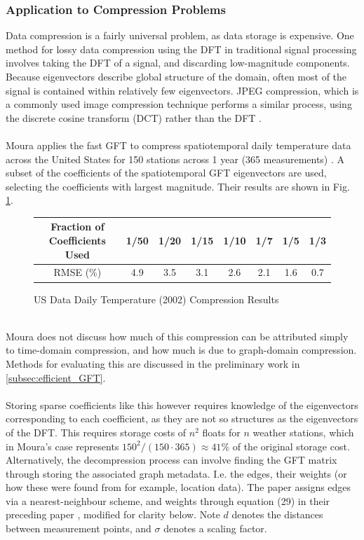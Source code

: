 \documentclass[12pt,a4paper]{article} %
\begin{document}
\subsubsection{Application to Compression Problems}
\label{subsec:compression}
Data compression is a fairly universal problem, as data storage is expensive. One method for lossy data compression using the DFT in traditional signal processing involves taking the DFT of a signal, and discarding low-magnitude components. Because eigenvectors describe global structure of the domain, often most of the signal is contained within relatively few eigenvectors. JPEG compression, which is a commonly used image compression technique performs a similar process, using the discrete cosine transform (DCT) rather than the DFT \cite{JPEG}.\\\\
Moura applies the fast GFT to compress spatiotemporal daily temperature data across the United States for 150 stations across 1 year (365 measurements) \cite{moura}. A subset of the coefficients of the spatiotemporal GFT eigenvectors are used, selecting the coefficients with largest magnitude. Their results are shown in Fig. \ref{fig:moura-results}.
\begin{figure}[!ht]
    \centering
        \begin{tabular}{|c|c|c|c|c|c|c|c|}
         \hline
         Fraction of Coefficients Used & 1/50 & 1/20 & 1/15 & 1/10 & 1/7 & 1/5 & 1/3 \\
         \hline
         RMSE (\%) & 4.9 & 3.5 & 3.1 & 2.6 & 2.1 & 1.6 & 0.7 \\
         \hline
    \end{tabular}
    \caption{US Data Daily Temperature (2002) Compression Results}
    \label{fig:moura-results}
\end{figure}\\
Moura does not discuss how much of this compression can be attributed simply to time-domain compression, and how much is due to graph-domain compression. Methods for evaluating this are discussed in the preliminary work in \ref{subsec:efficient_GFT}.\\\\
Storing sparse coefficients like this however requires knowledge of the eigenvectors corresponding to each coefficient, as they are not so structures as the eigenvectors of the DFT. This requires storage costs of $n^2$ floats for $n$ weather stations, which in Moura's case represents $150^2/(150\cdot365)\approx41\%$ of the original storage cost. Alternatively, the decompression process can involve finding the GFT matrix through storing the associated graph metadata. I.e. the edges, their weights (or how these were found from for example, location data). The paper assigns edges via a nearest-neighbour scheme, and weights through equation (29) in their preceding paper \cite{moura2}, modified for clarity below. Note $d$ denotes the distances between measurement points, and $\sigma$ denotes a scaling factor.
\end{document}
